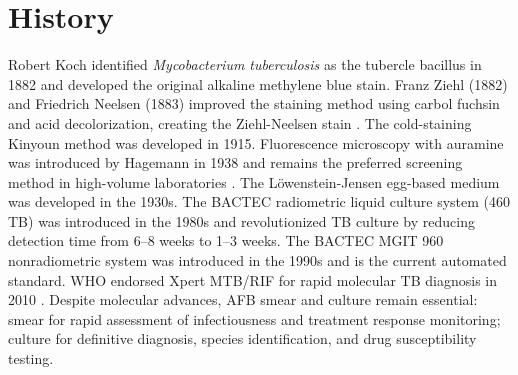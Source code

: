 \section*{History}
Robert Koch identified \textit{Mycobacterium tuberculosis} as the tubercle bacillus in 1882 and developed the original alkaline methylene blue stain. Franz Ziehl (1882) and Friedrich Neelsen (1883) improved the staining method using carbol fuchsin and acid decolorization, creating the Ziehl-Neelsen stain \cite{forbes2018practical}. The cold-staining Kinyoun method was developed in 1915. Fluorescence microscopy with auramine was introduced by Hagemann in 1938 and remains the preferred screening method in high-volume laboratories \cite{forbes2018practical}. The Löwenstein-Jensen egg-based medium was developed in the 1930s. The BACTEC radiometric liquid culture system (460 TB) was introduced in the 1980s and revolutionized TB culture by reducing detection time from 6--8 weeks to 1--3 weeks. The BACTEC MGIT 960 nonradiometric system was introduced in the 1990s and is the current automated standard. WHO endorsed Xpert MTB/RIF for rapid molecular TB diagnosis in 2010 \cite{who2021who}. Despite molecular advances, AFB smear and culture remain essential: smear for rapid assessment of infectiousness and treatment response monitoring; culture for definitive diagnosis, species identification, and drug susceptibility testing.

